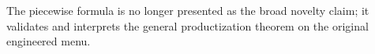 The piecewise formula is no longer presented as the broad novelty claim; it validates and interprets the general productization theorem on the original engineered menu.